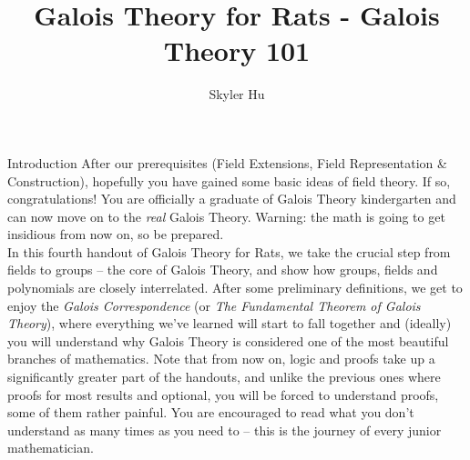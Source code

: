 \documentclass[12pt]{article}
\title{Galois Theory for Rats - Galois Theory 101}
\author{Skyler Hu}
\theoremstyle{definition}
\theoremstyle{definition}
\theoremstyle{definition}
\theoremstyle{definition}
\theoremstyle{definition}
\theoremstyle{definition}
\begin{document}
\linespread{1.05}
\maketitle
\newpage
\tableofcontents
\newpage

\begin{section}{Introduction}
    After our prerequisites (Field Extensions, Field Representation \& Construction), hopefully you have gained some basic ideas of 
    field theory. If so, congratulations! You are officially a graduate of Galois Theory kindergarten and can now move on to the  
    \textit{real} Galois Theory. Warning: the math is going to get insidious from now on, so be prepared.\\
    \break
    In this fourth handout of Galois Theory for Rats, we take the crucial step from fields to groups -- the core of Galois Theory, and 
    show how groups, fields and polynomials are closely interrelated. After some preliminary definitions, we get to enjoy the \textit{Galois 
    Correspondence} (or \textit{The Fundamental Theorem of Galois Theory}), where everything we've learned will start to fall together and 
    (ideally) you will understand why Galois Theory is considered one of the most beautiful branches of mathematics. Note that from now on, 
    logic and proofs take up a significantly greater part of the handouts, and unlike the previous ones where proofs for most results and optional,
    you will be forced to understand proofs, some of them rather painful. You are encouraged to read what you don't understand as many times 
    as you need to -- this is the journey of every junior mathematician.
\end{section}

\newpage
\end{document}
